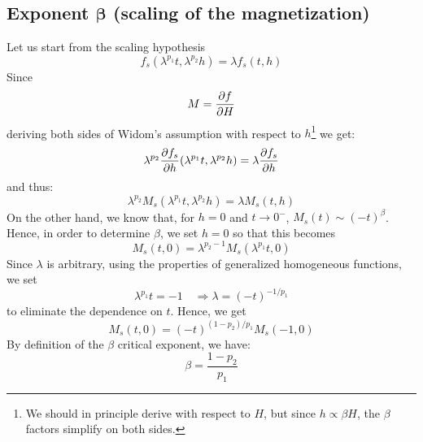 \documentclass[../main/main.tex]{subfiles}
\begin{document}
\subsection{Exponent \( \pmb{\beta } \) (scaling of the magnetization)}
Let us start from the scaling hypothesis
\begin{equation*}
  f_s (\lambda ^{p_1}t, \lambda ^{p_2}h) = \lambda f_s (t,h)
\end{equation*}
Since
\begin{equation*}
  M = \pdv{f}{H}
\end{equation*}
deriving both sides of Widom's assumption with respect to \( h \)\footnote{We should in principle derive with respect to \( H \), but since \( h \propto \beta H \), the  \( \beta  \) factors simplify on both sides.} we get:
\begin{equation*}
  \lambda ^{p_2} \pdv{f_s}{h} \qty(\lambda ^{p_1}t, \lambda ^{p_2}h) = \lambda \pdv{f_s}{h} (t,h)
\end{equation*}
and thus:
\begin{equation*}
   \lambda ^{p_2} M_s ( \lambda ^{p_1} t, \lambda ^{p_2} h) = \lambda M_s (t,h)
\end{equation*}
On the other hand, we know that, for \( h=0 \) and \( t \rightarrow 0^- \), \( M_s (t) \sim (-t)^{\beta } \). Hence, in order to determine \( \beta  \), we set \( h=0 \) so that this becomes
\begin{equation*}
  M_s (t,0) = \lambda ^{p_2 -1} M_s ( \lambda ^{p_1} t,0)
\end{equation*}
Since \( \lambda  \) is arbitrary, using the properties of generalized homogeneous functions, we set
\begin{equation*}
  \lambda ^{p_1} t = -1 \quad \Rightarrow \lambda = (-t)^{-1/p_1}
\end{equation*}
to eliminate the dependence on \( t \). Hence, we get
\begin{equation*}
  M_s (t,0) =  (-t)^{(1-p_2)/p_1} M_s (-1,0)
\end{equation*}
By definition of the \( \beta  \) critical exponent, we have:
\begin{equation}
  \beta = \frac{1-p_2}{p_1}
  \label{eq:19_10}
\end{equation}
\end{document}
